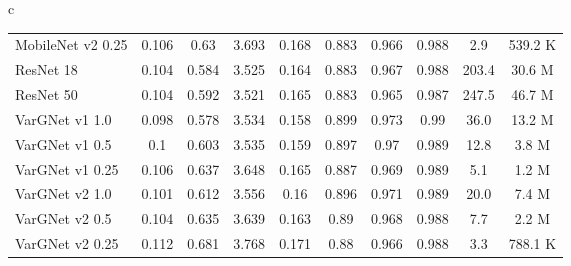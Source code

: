 \documentclass{article}
\begin{document}
\begin{table}
{\begin{tabular}{c}
\begin{tabular}{lccccccccc}
      MobileNet v2 0.25 & 0.106 & 0.63 & 3.693 & 0.168 & 0.883 & 0.966 & 0.988 & 2.9 & 539.2 K \\
ResNet 18 & 0.104 & 0.584 & 3.525 & 0.164 & 0.883 & 0.967 & 0.988 & 203.4    & 30.6 M \\
      ResNet 50 & 0.104 & 0.592 & 3.521 & 0.165 & 0.883 & 0.965 & 0.987 & 247.5    & 46.7 M \\ \midrule
      VarGNet v1 1.0 &  0.098 & 0.578 & 3.534 & 0.158 & 0.899 & 0.973 & 0.99 &  36.0   &13.2 M\\
      VarGNet v1 0.5 &  0.1 & 0.603 & 3.535 & 0.159 & 0.897 & 0.97 & 0.989 &  12.8   &3.8 M\\
      VarGNet v1 0.25 & 0.106 & 0.637 & 3.648 & 0.165 & 0.887 & 0.969 & 0.989 &  5.1 &1.2 M\\\midrule
      VarGNet v2 1.0 & 0.101 & 0.612 & 3.556 & 0.16 & 0.896 & 0.971 & 0.989 & 20.0& 7.4 M\\
      VarGNet v2 0.5 & 0.104 & 0.635 & 3.639 & 0.163 & 0.89 & 0.968 & 0.988 & 7.7& 2.2 M\\
      VarGNet v2 0.25 & 0.112 & 0.681 & 3.768 & 0.171 & 0.88 & 0.966 & 0.988 & 3.3& 788.1 K\\ \bottomrule
    \end{tabular}
  \end{tabular}
  }
\end{table}
\end{document}
